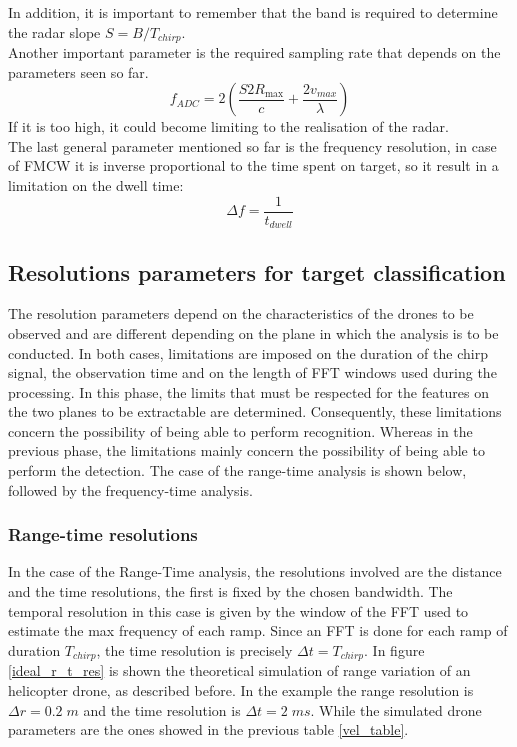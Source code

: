 In addition, it is important to remember that the band is required to determine the radar slope $S = B/T_{chirp}$.\\ 
Another important parameter is the required sampling rate that depends on the parameters seen so far.
\begin{equation}
f_{ADC }= 2 (\frac{S 2 R_{\max }}{c}+\frac{2 v_{max}}{\lambda})
\label{samplingfreq}
\end{equation}
If it is too high, it could become limiting to the realisation of the radar.\\
The last general parameter mentioned so far is the frequency resolution, in case of FMCW it is inverse proportional to the time spent on target, so it result in a limitation on the dwell time:
\begin{equation}
\Delta f= \frac{1}{t_{dwell}}
\end{equation}

\subsection{Resolutions parameters for target classification}
The resolution parameters depend on the characteristics of the drones to be observed and are different depending on the plane in which the analysis is to be conducted. In both cases, limitations are imposed on the duration of the chirp signal, the observation time and on the length of FFT windows used during the processing. In this phase, the limits that must be respected for the features on the two planes to be extractable are determined. Consequently, these limitations concern the possibility of being able to perform recognition. Whereas in the previous phase, the limitations mainly concern the possibility of being able to perform the detection. The case of the range-time analysis is shown below, followed by the frequency-time analysis.
\subsubsection{Range-time resolutions}
In the case of the Range-Time analysis, the resolutions involved are the distance and the time resolutions, the first is fixed by the chosen bandwidth. The temporal resolution in this case is given by the window of the FFT used to estimate the max frequency of each ramp. Since an FFT is done for each ramp of duration $T_{chirp}$, the time resolution is precisely $\Delta t = T_{chirp}$. In figure \ref{ideal_r_t_res} is shown the theoretical simulation of range variation of an helicopter drone, as described before. In the example the range resolution is $ \Delta r = 0.2\; m$ and the time resolution is $\Delta t = 2 \; ms$. While the simulated drone parameters are the ones showed in the previous table \ref{vel_table}.

